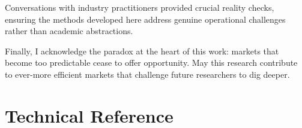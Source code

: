 \documentclass[12pt,letterpaper]{report}
\theoremstyle{definition}
\begin{document}
Conversations with industry practitioners provided crucial reality checks, ensuring the methods developed here address genuine operational challenges rather than academic abstractions.

Finally, I acknowledge the paradox at the heart of this work: markets that become too predictable cease to offer opportunity. May this research contribute to ever-more efficient markets that challenge future researchers to dig deeper.

\newpage
\tableofcontents

\newpage
\listoffigures

\newpage
\listoftables

\newpage
\renewcommand{\listalgorithmname}{List of Algorithms}
\listofalgorithms

\mainmatter











\appendix

\chapter{Technical Reference}
\end{document}
